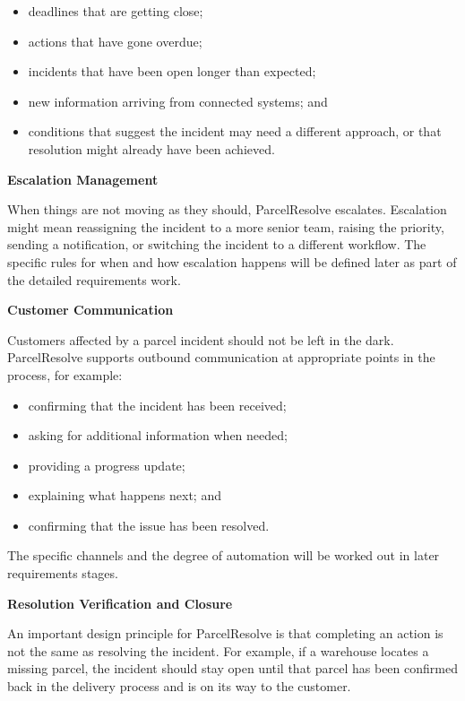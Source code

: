 \documentclass[11pt,a4paper]{article}
\begin{document}
\begin{itemize}
    \item deadlines that are getting close;
    \item actions that have gone overdue;
    \item incidents that have been open longer than expected;
    \item new information arriving from connected systems; and
    \item conditions that suggest the incident may need a different
    approach, or that resolution might already have been achieved.
\end{itemize}


\textbf{Escalation Management}

When things are not moving as they should, ParcelResolve escalates.
Escalation might mean reassigning the incident to a more senior team,
raising the priority, sending a notification, or switching the
incident to a different workflow. The specific rules for when and
how escalation happens will be defined later as part of the detailed
requirements work.


\textbf{Customer Communication}

Customers affected by a parcel incident should not be left in the
dark. ParcelResolve supports outbound communication at appropriate
points in the process, for example:

\begin{itemize}
    \item confirming that the incident has been received;
    \item asking for additional information when needed;
    \item providing a progress update;
    \item explaining what happens next; and
    \item confirming that the issue has been resolved.
\end{itemize}

The specific channels and the degree of automation will be worked
out in later requirements stages.


\textbf{Resolution Verification and Closure}

An important design principle for ParcelResolve is that completing
an action is not the same as resolving the incident. For example,
if a warehouse locates a missing parcel, the incident should stay
open until that parcel has been confirmed back in the delivery
process and is on its way to the customer.
\end{document}

